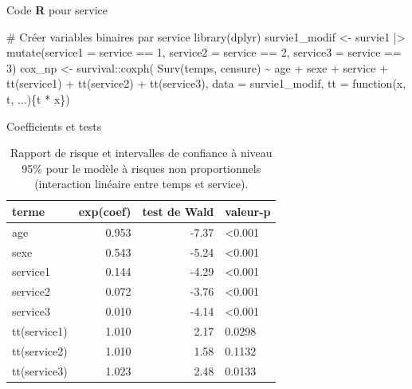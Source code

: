 \documentclass[
  ignorenonframetext,
]{beamer}
\newenvironment{Shaded}{\begin{snugshade}}{\end{snugshade}}
\newcommand{\AttributeTok}[1]{\textcolor[rgb]{0.40,0.45,0.13}{#1}}
\newcommand{\CommentTok}[1]{\textcolor[rgb]{0.37,0.37,0.37}{#1}}
\newcommand{\ControlFlowTok}[1]{\textcolor[rgb]{0.00,0.23,0.31}{#1}}
\newcommand{\DecValTok}[1]{\textcolor[rgb]{0.68,0.00,0.00}{#1}}
\newcommand{\FunctionTok}[1]{\textcolor[rgb]{0.28,0.35,0.67}{#1}}
\newcommand{\NormalTok}[1]{\textcolor[rgb]{0.00,0.23,0.31}{#1}}
\newcommand{\OtherTok}[1]{\textcolor[rgb]{0.00,0.23,0.31}{#1}}
\newcommand{\SpecialCharTok}[1]{\textcolor[rgb]{0.37,0.37,0.37}{#1}}
\begin{document}
\begin{frame}[fragile]{Code \textbf{R} pour service}
\protect\hypertarget{code-r-pour-service}{}
\begin{Shaded}
\begin{Highlighting}[numbers=left,,]
\CommentTok{\# Créer variables binaires par service}
\FunctionTok{library}\NormalTok{(dplyr)}
\NormalTok{survie1\_modif }\OtherTok{\textless{}{-}}\NormalTok{ survie1 }\SpecialCharTok{|\textgreater{}}
  \FunctionTok{mutate}\NormalTok{(}\AttributeTok{service1 =}\NormalTok{ service }\SpecialCharTok{==} \DecValTok{1}\NormalTok{,}
         \AttributeTok{service2 =}\NormalTok{ service }\SpecialCharTok{==} \DecValTok{2}\NormalTok{,}
         \AttributeTok{service3 =}\NormalTok{ service }\SpecialCharTok{==} \DecValTok{3}\NormalTok{)}
\NormalTok{cox\_np }\OtherTok{\textless{}{-}}\NormalTok{ survival}\SpecialCharTok{::}\FunctionTok{coxph}\NormalTok{(}
    \FunctionTok{Surv}\NormalTok{(temps, censure) }\SpecialCharTok{\textasciitilde{}} 
\NormalTok{     age }\SpecialCharTok{+}\NormalTok{ sexe }\SpecialCharTok{+}\NormalTok{ service }\SpecialCharTok{+} 
      \FunctionTok{tt}\NormalTok{(service1) }\SpecialCharTok{+} \FunctionTok{tt}\NormalTok{(service2) }\SpecialCharTok{+} \FunctionTok{tt}\NormalTok{(service3), }
     \AttributeTok{data =}\NormalTok{ survie1\_modif, }
     \AttributeTok{tt =} \ControlFlowTok{function}\NormalTok{(x, t, ...)\{t }\SpecialCharTok{*}\NormalTok{ x\})}
\end{Highlighting}
\end{Shaded}
\end{frame}

\begin{frame}{Coefficients et tests}
\protect\hypertarget{coefficients-et-tests}{}
\hypertarget{tbl-cox-nph}{}
\begin{table}
\caption{\label{tbl-cox-nph}Rapport de risque et intervalles de confiance à niveau 95\% pour le
modèle à risques non proportionnels (interaction linéaire entre temps et
service). }\tabularnewline

\centering
\begin{tabular}{lrrl}
\toprule
terme & exp(coef) & test de Wald & valeur-p\\
\midrule
age & 0.953 & -7.37 & <0.001\\
sexe & 0.543 & -5.24 & <0.001\\
service1 & 0.144 & -4.29 & <0.001\\
service2 & 0.072 & -3.76 & <0.001\\
service3 & 0.010 & -4.14 & <0.001\\
tt(service1) & 1.010 & 2.17 & 0.0298\\
tt(service2) & 1.010 & 1.58 & 0.1132\\
tt(service3) & 1.023 & 2.48 & 0.0133\\
\bottomrule
\end{tabular}
\end{table}
\end{frame}
\end{document}
